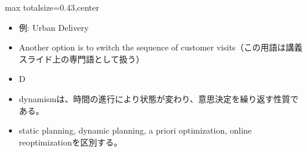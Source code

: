 \clearpage
{}
\begin{minipage}[t]{0.405\textwidth}
\begin{adjustbox}{max totalsize={\textwidth}{0.43\textheight},center}
\begin{minipage}{\textwidth}\scriptsize
{}\begin{itemize}
\item 例: Urban Delivery
\item Another option is to switch the sequence of customer visits（この用語は講義スライド上の専門語として扱う）
\item D
\end{itemize}\begin{itemize}
\item dynamismは、時間の進行により状態が変わり、意思決定を繰り返す性質である。
\item static planning, dynamic planning, a priori optimization, online reoptimizationを区別する。
\end{itemize}
\end{minipage}
\end{adjustbox}
\end{minipage}\hfill
